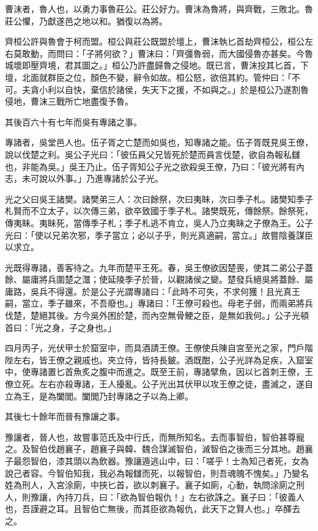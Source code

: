 
\begin{pinyinscope}
曹沫者，魯人也，以勇力事魯莊公。莊公好力。曹沫為魯將，與齊戰，三敗北。魯莊公懼，乃獻遂邑之地以和。猶復以為將。

齊桓公許與魯會于柯而盟。桓公與莊公既盟於壇上，曹沫執匕首劫齊桓公，桓公左右莫敢動，而問曰：「子將何欲？」曹沫曰：「齊彊魯弱，而大國侵魯亦甚矣。今魯城壞即壓齊境，君其圖之。」桓公乃許盡歸魯之侵地。既已言，曹沫投其匕首，下壇，北面就群臣之位，顏色不變，辭令如故。桓公怒，欲倍其約。管仲曰：「不可。夫貪小利以自快，棄信於諸侯，失天下之援，不如與之。」於是桓公乃遂割魯侵地，曹沫三戰所亡地盡復予魯。

其後百六十有七年而吳有專諸之事。

專諸者，吳堂邑人也。伍子胥之亡楚而如吳也，知專諸之能。伍子胥既見吳王僚，說以伐楚之利。吳公子光曰：「彼伍員父兄皆死於楚而員言伐楚，欲自為報私讎也，非能為吳。」吳王乃止。伍子胥知公子光之欲殺吳王僚，乃曰：「彼光將有內志，未可說以外事。」乃進專諸於公子光。

光之父曰吳王諸樊。諸樊弟三人：次曰餘祭，次曰夷眛，次曰季子札。諸樊知季子札賢而不立太子，以次傳三弟，欲卒致國于季子札。諸樊既死，傳餘祭。餘祭死，傳夷眛。夷眛死，當傳季子札；季子札逃不肯立，吳人乃立夷眛之子僚為王。公子光曰：「使以兄弟次邪，季子當立；必以子乎，則光真適嗣，當立。」故嘗陰養謀臣以求立。

光既得專諸，善客待之。九年而楚平王死。春，吳王僚欲因楚喪，使其二弟公子蓋餘、屬庸將兵圍楚之灊；使延陵季子於晉，以觀諸侯之變。楚發兵絕吳將蓋餘、屬庸路，吳兵不得還。於是公子光謂專諸曰：「此時不可失，不求何獲！且光真王嗣，當立，季子雖來，不吾廢也。」專諸曰：「王僚可殺也。母老子弱，而兩弟將兵伐楚，楚絕其後。方今吳外困於楚，而內空無骨鯁之臣，是無如我何。」公子光頓首曰：「光之身，子之身也。」

四月丙子，光伏甲士於窟室中，而具酒請王僚。王僚使兵陳自宮至光之家，門戶階陛左右，皆王僚之親戚也。夾立侍，皆持長鈹。酒既酣，公子光詳為足疾，入窟室中，使專諸置匕首魚炙之腹中而進之。既至王前，專諸擘魚，因以匕首刺王僚，王僚立死。左右亦殺專諸，王人擾亂。公子光出其伏甲以攻王僚之徒，盡滅之，遂自立為王，是為闔閭。闔閭乃封專諸之子以為上卿。

其後七十餘年而晉有豫讓之事。

豫讓者，晉人也，故嘗事范氏及中行氏，而無所知名。去而事智伯，智伯甚尊寵之。及智伯伐趙襄子，趙襄子與韓、魏合謀滅智伯，滅智伯之後而三分其地。趙襄子最怨智伯，漆其頭以為飲器。豫讓遁逃山中，曰：「嗟乎！士為知己者死，女為說己者容。今智伯知我，我必為報讎而死，以報智伯，則吾魂魄不愧矣。」乃變名姓為刑人，入宮涂廁，中挾匕首，欲以刺襄子。襄子如廁，心動，執問涂廁之刑人，則豫讓，內持刀兵，曰：「欲為智伯報仇！」左右欲誅之。襄子曰：「彼義人也，吾謹避之耳。且智伯亡無後，而其臣欲為報仇，此天下之賢人也。」卒醳去之。


\end{pinyinscope}
